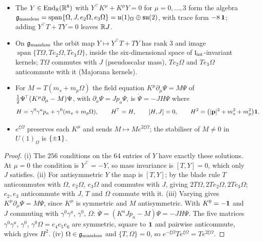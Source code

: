 \begin{proposition}
\label{d2:prop:massless}
\begin{itemize}
\item[(i)] The $Y\in\operatorname{End}_{\mathbb{R}}(\mathbb{R}^8)$ with $Y^{\!\top}K^\mu+K^\mu Y=0$ for $\mu=0,\dots,3$ form the algebra
$\mathfrak g_{\rm massless}=\operatorname{span}\{\Omega,J,e_2\Omega,e_3\Omega\}=\mathfrak{u}(1)_\Omega\oplus\mathfrak{su}(2)$, with trace form $-8\,\mathbf 1$; adding
$Y^{\!\top}T+TY=0$ leaves $\mathbb{R} J$.
\item[(ii)] On $\mathfrak g_{\rm massless}$ the orbit map $Y\mapsto Y^{\!\top}T+TY$ has rank $3$ and image $\operatorname{span}\{T\Omega,Te_2\Omega,Te_3\Omega\}$,
inside the six-dimensional space of $\mathfrak l_{\rm int}$-invariant kernels; $T\Omega$ commutes with $J$ (pseudoscalar mass), $Te_2\Omega$ and $Te_3\Omega$ anticommute
with it (Majorana kernels).
\item[(iii)] For $M=T(m_s+m_p\Omega)$ the field equation $K^\mu\partial_\mu\Psi=M\Psi$ of $\tfrac12\Psi^{\!\top}(K^\mu\partial_\mu-M)\Psi$, with
$\partial_a\Psi=Jp_a\Psi$, is $\dot\Psi=-JH\Psi$ where
\begin{equation}
\label{d2:eq:Hmp}
H=\gamma^0\gamma^ap_a+\gamma^0(m_s+m_p\Omega),\qquad H^{\!\top}=H,\qquad [H,J]=0,\qquad H^2=\bigl(|\mathbf p|^2+m_s^2+m_p^2\bigr)\mathbf 1 .
\end{equation}
\item[(iv)] $e^{\xi\Omega}$ preserves each $K^\mu$ and sends $M\mapsto Me^{2\xi\Omega}$; the stabiliser of $M\neq0$ in $U(1)_\Omega$ is $\{\pm\mathbf 1\}$.
\end{itemize}
\end{proposition}

\begin{proof}
(i) The $256$ conditions on the $64$ entries of $Y$ have exactly these solutions. At $\mu=0$ the condition is $Y^{\!\top}=-Y$, so mass invariance is
$[T,Y]=0$, which only $J$ satisfies. (ii) For antisymmetric $Y$ the map is $[T,Y]$; by the blade rule $T$ anticommutes with $\Omega$, $e_2\Omega$,
$e_3\Omega$ and commutes with $J$, giving $2T\Omega,2Te_2\Omega,2Te_3\Omega$; $e_2,e_3$ anticommute with $J$, $T$ and $\Omega$ commute with it. (iii) Varying
gives $K^\mu\partial_\mu\Psi=M\Psi$, since $K^\mu$ is symmetric and $M$ antisymmetric. With $K^0=-\mathbf 1$ and $J$ commuting with $\gamma^0\gamma^a$,
$\gamma^0$, $\Omega$: $\dot\Psi=(K^aJp_a-M)\Psi=-JH\Psi$. The five matrices $\gamma^0\gamma^a$, $\gamma^0$, $\gamma^0\Omega=e_4e_5e_6$ are symmetric, square
to $\mathbf 1$ and pairwise anticommute, which gives $H^2$. (iv) $\Omega\in\mathfrak g_{\rm massless}$ and $\{T,\Omega\}=0$, so
$e^{-\xi\Omega}Te^{\xi\Omega}=Te^{2\xi\Omega}$.
\end{proof}

